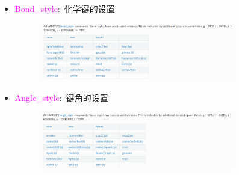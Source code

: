 \frame
{
	\frametitle{}
	\begin{itemize}
		\item \textcolor{magenta}{Bond\_style}:~化学键的设置
\begin{figure}[h!]
\centering
\vspace*{-0.1in}
\includegraphics[height=1.0in,width=3.4in,viewport=0 0 1100 350,clip]{Figures/LAMMPS-bond_style-command.png}
\label{LAMMPS-bond_style}
\end{figure}
		\item \textcolor{magenta}{Angle\_style}:~键角的设置
\begin{figure}[h!]
\centering
\vspace*{-0.1in}
\includegraphics[height=1.0in,width=3.4in,viewport=0 0 1100 350,clip]{Figures/LAMMPS-angle_style-command.png}
\label{LAMMPS-angle_style}
\end{figure}
	\end{itemize}
}

